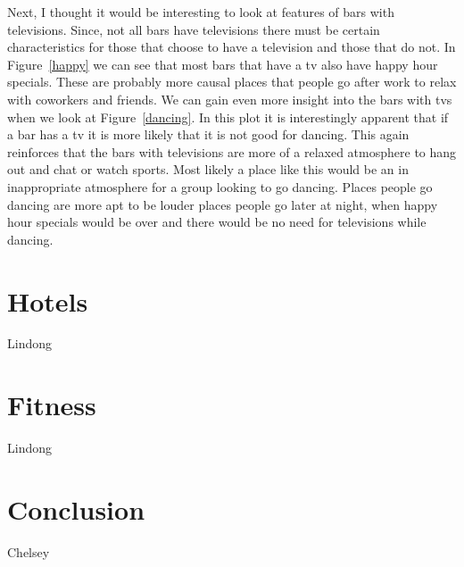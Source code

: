 \documentclass[11pt]{article}
\begin{document}
Next, I thought it would be interesting to look at features of bars with televisions.  Since, not all bars have televisions there must be certain characteristics for those that choose to have a television and those that do not.   In  Figure~\ref{happy} we can see that most bars that have a tv also have happy hour specials.  These are probably more causal places that people go after work to relax with coworkers and friends.  We can gain even more insight into the bars with tvs when we look at  Figure~\ref{dancing}.  In this plot it is interestingly apparent that if a bar has a tv it is more likely that it is not good for dancing.  This again reinforces that the bars with televisions are more of a relaxed atmosphere to hang out and chat or watch sports.  Most likely a place like this would be an in inappropriate atmosphere for a group looking to go dancing.  Places people go dancing are more apt to be louder places people go later at night, when happy hour specials would be over and there would be no need for televisions while dancing.  





\section{Hotels}

Lindong

\section{Fitness}

Lindong


\section{Conclusion}


Chelsey
\end{document}
